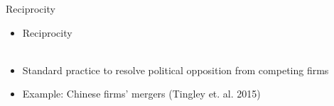 \documentclass{beamer}
\begin{document}
\begin{frame}{Reciprocity}

\begin{itemize}
\item{Reciprocity}\\

\\

\justifying
\item{Standard practice to resolve political opposition from competing firms}\\
\item{Example: Chinese firms' mergers (Tingley et. al. 2015)}
\end{itemize}



\end{frame}
\end{document}
